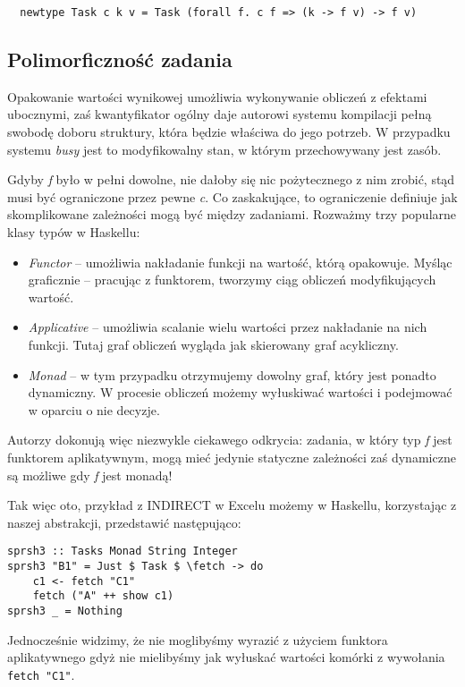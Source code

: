 \begin{lstlisting}
  newtype Task c k v = Task (forall f. c f => (k -> f v) -> f v)
\end{lstlisting}

\subsection{Polimorficzność zadania}

Opakowanie wartości wynikowej umożliwia wykonywanie obliczeń z efektami ubocznymi, zaś kwantyfikator ogólny daje autorowi systemu kompilacji pełną swobodę doboru struktury, która będzie właściwa do jego potrzeb. W przypadku systemu \textit{busy} jest to modyfikowalny stan, w którym przechowywany jest zasób.

Gdyby \textit{f} było w pełni dowolne, nie dałoby się nic pożytecznego z nim zrobić, stąd musi być ograniczone przez pewne \textit{c}. Co zaskakujące, to ograniczenie definiuje jak skomplikowane zależności mogą być między zadaniami. Rozważmy trzy popularne klasy typów w Haskellu:
\begin{itemize}
\item \textit{Functor} -- umożliwia nakładanie funkcji na wartość, którą opakowuje. Myśląc graficznie -- pracując z funktorem, tworzymy ciąg obliczeń modyfikujących wartość.
\item \textit{Applicative} -- umożliwia scalanie wielu wartości przez nakładanie na nich funkcji. Tutaj graf obliczeń wygląda jak skierowany graf acykliczny.
\item \textit{Monad} -- w tym przypadku otrzymujemy dowolny graf, który jest ponadto dynamiczny. W procesie obliczeń możemy wyłuskiwać wartości i podejmować w oparciu o nie decyzje.
\end{itemize}

Autorzy dokonują więc niezwykle ciekawego odkrycia: zadania, w który typ \textit{f} jest funktorem aplikatywnym, mogą mieć jedynie statyczne zależności zaś dynamiczne są możliwe gdy \textit{f} jest monadą!

Tak więc oto, przykład z INDIRECT w Excelu możemy w Haskellu, korzystając z naszej abstrakcji, przedstawić następująco:

\begin{lstlisting}
sprsh3 :: Tasks Monad String Integer
sprsh3 "B1" = Just $ Task $ \fetch -> do
    c1 <- fetch "C1"
    fetch ("A" ++ show c1)
sprsh3 _ = Nothing
\end{lstlisting}

Jednocześnie widzimy, że nie moglibyśmy wyrazić z użyciem funktora aplikatywnego gdyż nie mielibyśmy jak wyłuskać wartości komórki z wywołania \lstinline{fetch "C1"}.

